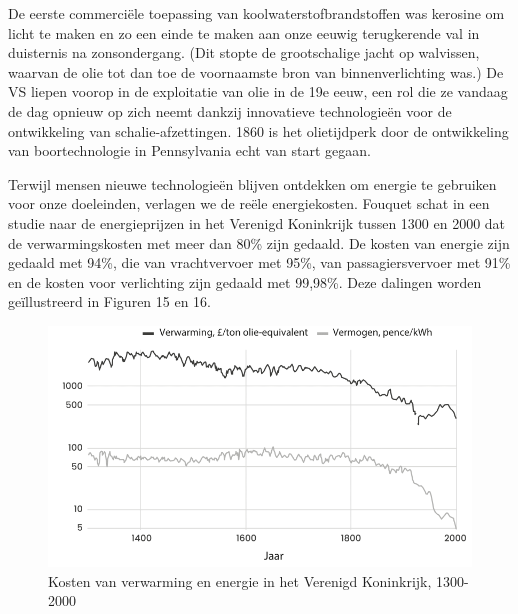 \begin{blockquotebox}
    \par\vspace{1em}\noindent
    De eerste commerciële toepassing van koolwaterstofbrandstoffen was kerosine om licht te maken en zo een einde te maken aan onze eeuwig terugkerende val in duisternis na zonsondergang. (Dit stopte de grootschalige jacht op walvissen, waarvan de olie tot dan toe de voornaamste bron van binnenverlichting was.) De VS liepen voorop in de exploitatie van olie in de 19e eeuw, een rol die ze vandaag de dag opnieuw op zich neemt dankzij innovatieve technologieën voor de ontwikkeling van schalie-afzettingen. 1860 is het olietijdperk door de ontwikkeling van boortechnologie in Pennsylvania echt van start gegaan.\footnotemark
\end{blockquotebox}

Terwijl mensen nieuwe technologieën blijven ontdekken om energie te gebruiken voor onze doeleinden, verlagen we de reële energiekosten. Fouquet schat in een studie naar de energieprijzen in het Verenigd Koninkrijk tussen 1300 en 2000 dat de verwarmingskosten met meer dan 80\% zijn gedaald. De kosten van energie zijn gedaald met 94\%, die van  vrachtvervoer met 95\%, van passagiersvervoer met 91\% en de kosten voor verlichting zijn gedaald met 99,98\%. Deze dalingen worden geïllustreerd in Figuren 15 en 16.\autocite{104}

\begin{figure}[!htb]
\centering
    \includegraphics[width=\textwidth]{figures/fig15-1.png}
    \caption[Kosten van verwarming en energie in het Verenigd Koninkrijk, 1300-2000.]{Kosten van verwarming en energie in het Verenigd Koninkrijk, 1300-2000}
    \label{fig15}
\end{figure}

